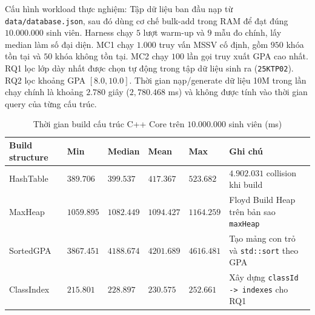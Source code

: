 \documentclass[14pt,a4paper]{extarticle}
\begin{document}
Cấu hình workload thực nghiệm: Tập dữ liệu ban đầu nạp từ \texttt{data/database.json}, sau đó dùng cơ chế bulk-add trong RAM để đạt đúng $10.000.000$ sinh viên. Harness chạy $5$ lượt warm-up và $9$ mẫu đo chính, lấy median làm số đại diện. MC1 chạy $1.000$ truy vấn MSSV cố định, gồm $950$ khóa tồn tại và $50$ khóa không tồn tại. MC2 chạy $100$ lần gọi truy xuất GPA cao nhất. RQ1 lọc lớp dày nhất được chọn tự động trong tập dữ liệu sinh ra (\texttt{25KTP02}). RQ2 lọc khoảng GPA $[8.0, 10.0]$. Thời gian nạp/generate dữ liệu 10M trong lần chạy chính là khoảng $2.780$ giây ($2{,}780.468$ ms) và không được tính vào thời gian query của từng cấu trúc.

\begin{table}[H]
\centering
\begingroup
\begin{singlespace}
\setlength{\tabcolsep}{2pt}
\renewcommand{\arraystretch}{1.3}
\begin{tabularx}{\textwidth}{|>{\raggedright\arraybackslash}m{2.3cm}|>{\centering\arraybackslash}m{2.0cm}|>{\centering\arraybackslash}m{2.0cm}|>{\centering\arraybackslash}m{2.0cm}|>{\centering\arraybackslash}m{2.0cm}|>{\raggedright\arraybackslash}X|}
\hline
\textbf{Build structure} & \textbf{Min} & \textbf{Median} & \textbf{Mean} & \textbf{Max} & \textbf{Ghi chú} \\ \hline
HashTable & $389.706$ & $399.537$ & $417.367$ & $523.682$ & $4.902.031$ collision khi build \\ \hline
MaxHeap & $1059.895$ & $1082.449$ & $1094.427$ & $1164.259$ & Floyd Build Heap trên bản sao \texttt{maxHeap} \\ \hline
SortedGPA & $3867.451$ & $4188.674$ & $4201.689$ & $4616.481$ & Tạo mảng con trỏ và \texttt{std::sort} theo GPA \\ \hline
ClassIndex & $215.801$ & $228.897$ & $230.575$ & $252.661$ & Xây dựng \texttt{classId -> indexes} cho RQ1 \\ \hline
\end{tabularx}
\end{singlespace}
\endgroup
\caption{Thời gian build cấu trúc C++ Core trên $10.000.000$ sinh viên (ms)}
\label{tab:core_build_benchmark}
\end{table}
\end{document}
